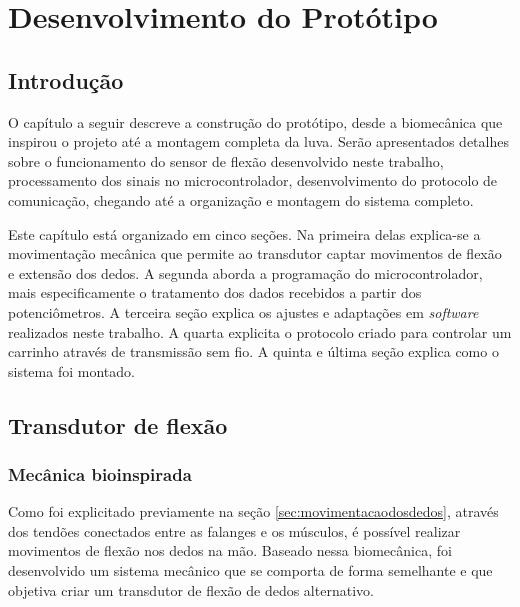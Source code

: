 \documentclass[
	12pt,				%
	openright,			%
	oneside,			%
	a4paper,			%
	english,			%
	brazil				%
	]{abntex2}
\begin{document}
%
%
	
	\chapter{Desenvolvimento do Protótipo}

		\section{Introdução}
		
		O capítulo a seguir descreve a construção do protótipo, desde a biomecânica que inspirou o projeto até a montagem completa da luva. Serão apresentados detalhes sobre o funcionamento do sensor de flexão desenvolvido neste trabalho, processamento dos sinais no microcontrolador, desenvolvimento do protocolo de comunicação, chegando até a organização e montagem do sistema completo.
		
		Este capítulo está organizado em cinco seções. Na primeira delas explica-se a movimentação mecânica que permite ao transdutor captar movimentos de flexão e extensão dos dedos. A segunda aborda a programação do microcontrolador, mais especificamente o tratamento dos dados recebidos a partir dos potenciômetros. A terceira seção explica os ajustes e adaptações em \textit{software} realizados neste trabalho. A quarta explicita o protocolo criado para controlar um carrinho através de transmissão sem fio. A quinta e última seção explica como o sistema foi montado.



		\section{Transdutor de flexão}

			\subsection{Mecânica bioinspirada}

		Como foi explicitado previamente na seção \ref{sec:movimentacaodosdedos}, através dos tendões conectados entre as falanges e os músculos, é possível realizar movimentos de flexão nos dedos na mão. Baseado nessa biomecânica, foi desenvolvido um sistema mecânico que se comporta de forma semelhante e que objetiva criar um transdutor de flexão de dedos alternativo. 
\end{document}
